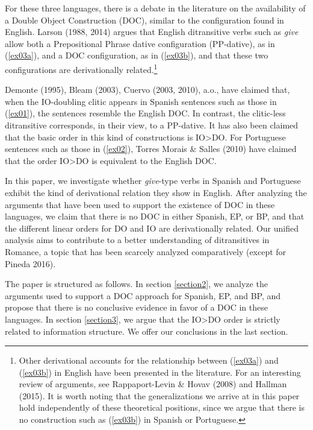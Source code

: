 \documentclass[output=paper,modfonts,nonflat]{langsci/langscibook}
\begin{document}
For these three languages, there is a debate in the literature on the availability of a Double Object Construction (DOC), similar to the configuration found in English. Larson (1988, 2014) argues that English ditransitive verbs such as \textit{give} allow both a Prepositional Phrase dative configuration (PP-dative), as in (\ref{ex03a}), and a DOC configuration, as in (\ref{ex03b}), and that these two configurations are derivationally related.\footnote{Other derivational accounts for the relationship between (\ref{ex03a}) and (\ref{ex03b}) in English have been presented in the literature. For an interesting review of arguments, see Rappaport-Levin \& Hovav (2008) and Hallman (2015). It is worth noting that the generalizations we arrive at in this paper hold independently of these theoretical positions, since we argue that there is no construction such as (\ref{ex03b}) in Spanish or Portuguese.} 

\ea \label{ex03}
	\label{ex03a}
	\label{ex03b}
	\z
\z

Demonte (1995), Bleam (2003), Cuervo (2003, 2010), a.o., have claimed that, when the IO-doubling clitic appears in Spanish sentences such as those in (\ref{ex01}), the sentences resemble the English DOC. In contrast, the clitic-less ditransitive corresponds, in their view, to a PP-dative. It has also been claimed that the basic order in this kind of constructions is IO>DO. For Portuguese sentences such as those in (\ref{ex02}), Torres Morais \& Salles (2010) have claimed that the order IO>DO is equivalent to the English DOC.

In this paper, we investigate whether \textit{give}-type verbs in Spanish and Portuguese exhibit the kind of derivational relation they show in English. After analyzing the arguments that have been used to support the existence of DOC in these languages, we claim that there is no DOC in either Spanish, EP, or BP, and that the different linear orders for DO and IO are derivationally related. Our unified analysis aims to contribute to a better understanding of ditransitives in Romance, a topic that has been scarcely analyzed comparatively (except for Pineda 2016).

The paper is structured as follows. In section \ref{section2}, we analyze the arguments used to support a DOC approach for Spanish, EP, and BP, and propose that there is no conclusive evidence in favor of a DOC in these languages. In section \ref{section3}, we argue that the IO>DO order is strictly related to information structure. We offer our conclusions in the last section.
\end{document}
